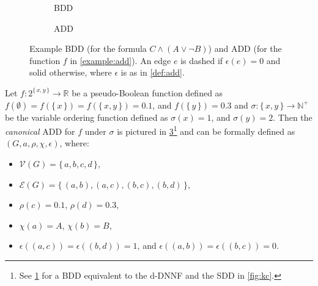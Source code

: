 \begin{figure}[t]
  \centering
  \begin{subfigure}{0.49\textwidth}
    \centering
    \caption{BDD}\label{fig:bdd}
  \end{subfigure}
  \begin{subfigure}{0.49\textwidth}
    \centering
    \caption{ADD}\label{fig:add}
  \end{subfigure} %
  \caption{Example BDD (for the formula $C \land (A \lor \neg B)$) and ADD (for
    the function $f$ in \cref{example:add}). An edge $e$ is dashed if
    $\epsilon(e) = 0$ and solid otherwise, where $\epsilon$ is as in
    \cref{def:add}.}
\end{figure}

\begin{example}\label{example:add}
  Let $f\colon 2^{\{\,x, y\,\}} \to \mathbb{R}$ be a pseudo-Boolean function
  defined as $f(\emptyset) = f(\{\,x\,\}) = f(\{\,x, y\,\}) = 0.1$, and
  $f(\{\,y\,\}) = 0.3$ and $\sigma\colon \{\,x, y\,\} \to \mathbb{N}^+$ be the
  variable ordering function defined as $\sigma(x) = 1$, and $\sigma(y) = 2$.
  Then the \emph{canonical} ADD for $f$ under $\sigma$ is pictured in
  \cref{fig:add}\footnote{See \cref{fig:bdd} for a BDD equivalent to the d-DNNF
    and the SDD in \cref{fig:kc}.} and can be formally defined as
  $(G, a, \rho, \chi, \epsilon)$, where:
  \begin{itemize}
    \item $\mathcal{V}(G) = \{\,a, b, c, d\,\}$,
    \item $\mathcal{E}(G) = \{\,(a, b), (a, c), (b, c), (b, d)\,\}$,
    \item $\rho(c) = 0.1$, $\rho(d) = 0.3$,
    \item $\chi(a) = A$, $\chi(b) = B$,
    \item $\epsilon((a, c)) = \epsilon((b, d)) = 1$, and
          $\epsilon((a, b)) = \epsilon((b, c)) = 0$.
  \end{itemize}
\end{example}

